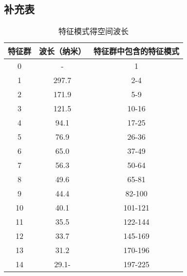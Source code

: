 \documentclass[lang=cn,a4paper,newtx,citestyle=gb7714-2015, bibstyle=gb7714-2015]{elegantpaper}
\begin{document}
\subsection{补充表}

\begin{table}[htbp]
	\centering
	\small
	\caption{特征模式得空间波长}
	\begin{tabular}{ccc}
		\toprule
		特征群         &        波长（纳米）  & 特征群中包含的特征模式     \\
		\midrule
		0      &   -      &      1  \\
		1      &   297.7      &      2-4  \\
		2      &   171.9      &      5-9  \\
		3      &   121.5      &      10-16  \\
		4      &   94.1      &      17-25  \\
		5      &   76.9      &      26-36  \\
		6      &   65.0      &      37-49  \\
		7      &   56.3      &      50-64  \\
		8      &   49.6      &      65-81  \\
		9      &   44.4      &      82-100  \\
		10      &   40.1      &      101-121  \\
		11      &   35.5      &      122-144  \\
		12      &   33.7      &      145-169  \\
		13      &   31.2      &      170-196  \\
		14      &   29.1-      &      197-225  \\

		\bottomrule
	\end{tabular}%
	\label{tab:spatial_wavelength}%
\end{table}%
\end{document}
